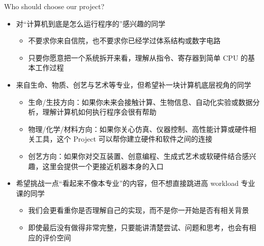 \documentclass[aspectratio=169,10pt]{beamer}
\begin{document}
\begin{frame}[fragile,shrink=12]{Who should choose our project?}
\footnotesize
\begin{itemize}
\item
  对``计算机到底是怎么运行程序的''感兴趣的同学

  \begin{itemize}
  \item
    不要求你来自信院，也不要求你已经学过体系结构或数字电路
  \item
    只要你愿意把一个系统拆开来看，理解从指令、寄存器到简单 CPU 的基本工作过程
  \end{itemize}
\item
  来自生命、物质、创艺与艺术等专业，但希望补一块计算机底层视角的同学

  \begin{itemize}
  \item
    生命/生技方向：如果你未来会接触计算、生物信息、自动化实验或数据分析，理解计算机如何执行程序会很有帮助
  \item
    物理/化学/材料方向：如果你关心仿真、仪器控制、高性能计算或硬件相关工具，这个 Project 可以帮你建立硬件和软件之间的连接
  \item
    创艺方向：如果你对交互装置、创意编程、生成式艺术或软硬件结合感兴趣，这里会提供一个更接近机器本身的入口
  \end{itemize}
\item
  希望挑战一点``看起来不像本专业''的内容，但不想直接跳进高 workload 专业课的同学

  \begin{itemize}
  \item
    我们会更看重你是否理解自己的实现，而不是你一开始是否有相关背景
  \item
    即使最后没有做得非常完整，只要能讲清楚尝试、问题和思考，也会有相应的评价空间
  \end{itemize}
\end{itemize}
\end{frame}

\end{document}
